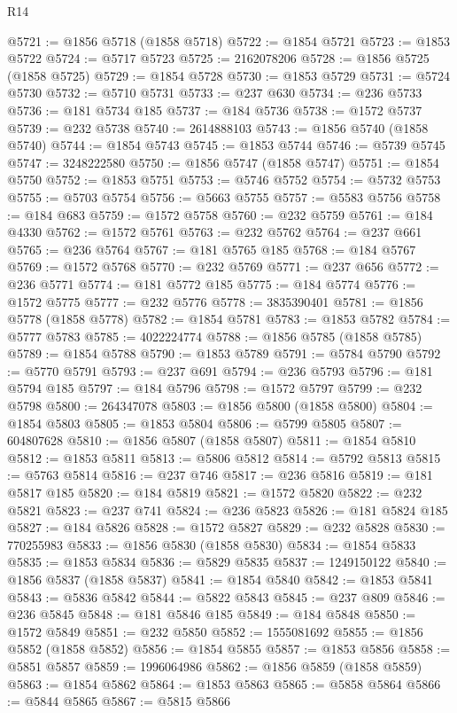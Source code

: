 \begin{lexlean}{R14}
\begin{coremodule}
@5721 := @1856 @5718 (@1858 @5718)
@5722 := @1854 @5721
@5723 := @1853 @5722
@5724 := @5717 @5723
@5725 := 2162078206
@5728 := @1856 @5725 (@1858 @5725)
@5729 := @1854 @5728
@5730 := @1853 @5729
@5731 := @5724 @5730
@5732 := @5710 @5731
@5733 := @237 @630
@5734 := @236 @5733
@5736 := @181 @5734 @185
@5737 := @184 @5736
@5738 := @1572 @5737
@5739 := @232 @5738
@5740 := 2614888103
@5743 := @1856 @5740 (@1858 @5740)
@5744 := @1854 @5743
@5745 := @1853 @5744
@5746 := @5739 @5745
@5747 := 3248222580
@5750 := @1856 @5747 (@1858 @5747)
@5751 := @1854 @5750
@5752 := @1853 @5751
@5753 := @5746 @5752
@5754 := @5732 @5753
@5755 := @5703 @5754
@5756 := @5663 @5755
@5757 := @5583 @5756
@5758 := @184 @683
@5759 := @1572 @5758
@5760 := @232 @5759
@5761 := @184 @4330
@5762 := @1572 @5761
@5763 := @232 @5762
@5764 := @237 @661
@5765 := @236 @5764
@5767 := @181 @5765 @185
@5768 := @184 @5767
@5769 := @1572 @5768
@5770 := @232 @5769
@5771 := @237 @656
@5772 := @236 @5771
@5774 := @181 @5772 @185
@5775 := @184 @5774
@5776 := @1572 @5775
@5777 := @232 @5776
@5778 := 3835390401
@5781 := @1856 @5778 (@1858 @5778)
@5782 := @1854 @5781
@5783 := @1853 @5782
@5784 := @5777 @5783
@5785 := 4022224774
@5788 := @1856 @5785 (@1858 @5785)
@5789 := @1854 @5788
@5790 := @1853 @5789
@5791 := @5784 @5790
@5792 := @5770 @5791
@5793 := @237 @691
@5794 := @236 @5793
@5796 := @181 @5794 @185
@5797 := @184 @5796
@5798 := @1572 @5797
@5799 := @232 @5798
@5800 := 264347078
@5803 := @1856 @5800 (@1858 @5800)
@5804 := @1854 @5803
@5805 := @1853 @5804
@5806 := @5799 @5805
@5807 := 604807628
@5810 := @1856 @5807 (@1858 @5807)
@5811 := @1854 @5810
@5812 := @1853 @5811
@5813 := @5806 @5812
@5814 := @5792 @5813
@5815 := @5763 @5814
@5816 := @237 @746
@5817 := @236 @5816
@5819 := @181 @5817 @185
@5820 := @184 @5819
@5821 := @1572 @5820
@5822 := @232 @5821
@5823 := @237 @741
@5824 := @236 @5823
@5826 := @181 @5824 @185
@5827 := @184 @5826
@5828 := @1572 @5827
@5829 := @232 @5828
@5830 := 770255983
@5833 := @1856 @5830 (@1858 @5830)
@5834 := @1854 @5833
@5835 := @1853 @5834
@5836 := @5829 @5835
@5837 := 1249150122
@5840 := @1856 @5837 (@1858 @5837)
@5841 := @1854 @5840
@5842 := @1853 @5841
@5843 := @5836 @5842
@5844 := @5822 @5843
@5845 := @237 @809
@5846 := @236 @5845
@5848 := @181 @5846 @185
@5849 := @184 @5848
@5850 := @1572 @5849
@5851 := @232 @5850
@5852 := 1555081692
@5855 := @1856 @5852 (@1858 @5852)
@5856 := @1854 @5855
@5857 := @1853 @5856
@5858 := @5851 @5857
@5859 := 1996064986
@5862 := @1856 @5859 (@1858 @5859)
@5863 := @1854 @5862
@5864 := @1853 @5863
@5865 := @5858 @5864
@5866 := @5844 @5865
@5867 := @5815 @5866

\end{coremodule}
\end{lexlean}
